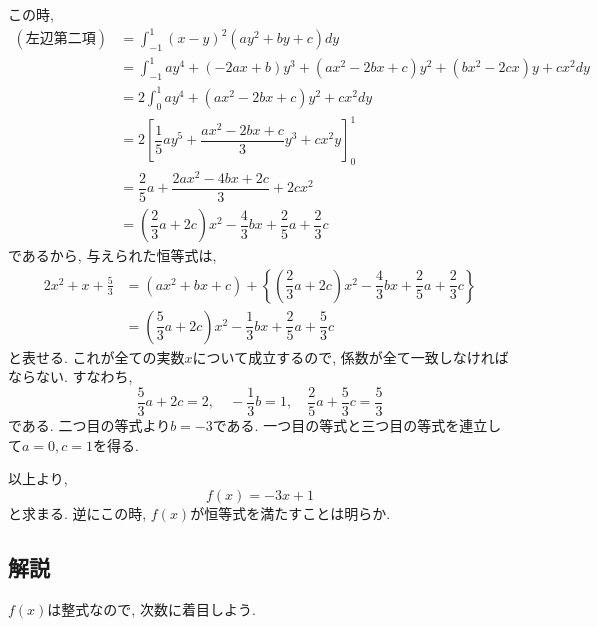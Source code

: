 \documentclass[dvipdfmx,a4paper]{jsarticle}
\begin{document}
    この時, 
    \begin{align*}
        \mathrm{(左辺第二項)} 
        &= \int_{-1}^1 (x-y)^2 (ay^2 + by + c) dy \\
        &= \int_{-1}^1 ay^4 +(-2ax + b)y^3 +(ax^2 -2bx+ c)y^2 +(bx^2 -2cx)y + cx^2 dy \\
        &= 2\int_{0}^1 ay^4 +(ax^2-2bx + c)y^2 + cx^2 dy \\
        &= 2\left[\dfrac{1}{5}a y^5 + \dfrac{ax^2-2bx + c}{3} y^3 + cx^2 y\right]_0^1 \\
        &= \dfrac{2}{5}a + \dfrac{2ax^2-4bx + 2c}{3} + 2cx^2 \\
        &= \left(\dfrac{2}{3}a+2c\right)x^2 -\dfrac{4}{3}bx + \dfrac{2}{5}a + \dfrac{2}{3}c
    \end{align*}
    であるから, 与えられた恒等式は, 
    \begin{align*}
        2x^2 + x + \frac{5}{3} 
        &= (ax^2+bx+c) + \left\{\left(\dfrac{2}{3}a+2c\right)x^2 -\dfrac{4}{3}bx + \dfrac{2}{5}a + \dfrac{2}{3}c\right\} \\
        &= \left(\dfrac{5}{3}a+2c\right)x^2 - \dfrac{1}{3}bx + \dfrac{2}{5}a + \dfrac{5}{3}c
    \end{align*}
    と表せる. これが全ての実数$x$について成立するので, 係数が全て一致しなければならない. 
    すなわち, 
    \begin{equation*}
        \dfrac{5}{3}a+2c = 2, \quad -\dfrac{1}{3}b = 1, \quad \dfrac{2}{5}a + \dfrac{5}{3}c = \frac{5}{3} 
    \end{equation*}
    である. 二つ目の等式より$b = -3$である. 
    一つ目の等式と三つ目の等式を連立して$a = 0, c = 1$を得る. 
    

    以上より, 
    \begin{equation*}
        f(x) = -3x + 1
    \end{equation*}
    と求まる. 逆にこの時, $f(x)$が恒等式を満たすことは明らか. 

    \subsection{解説}
    $f(x)$は整式なので, 次数に着目しよう. 
\end{document}
